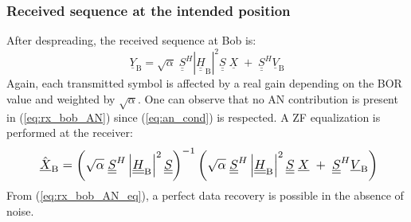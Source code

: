 \documentclass[conference]{IEEEtran}
\begin{document}
\subsubsection{Received sequence at the intended position}
After despreading, the received sequence at Bob is: 
\begin{equation}
    \underline{Y}_{\text{B}} = \sqrt{\alpha} \; \underline{\underline{S}}^H \left|\underline{\underline{H}}_{\text{B}} \right|^2 \underline{\underline{S}}\; \underline{X} \;  +  \;  \underline{\underline{S}}^H \underline{V}_\text{B} 
    \label{eq:rx_bob_AN}
\end{equation}
Again, each transmitted symbol is affected by a real gain depending on the BOR value and weighted by $\sqrt{\alpha}$. One can observe that no AN contribution is present in (\ref{eq:rx_bob_AN}) since (\ref{eq:an_cond}) is respected. A ZF equalization is performed at the receiver:
\begin{equation}
 \resizebox{0.89\hsize}{!}{
    $\hat{\underline{X}}_{\text{B}} = \left( \sqrt{\alpha} \; \underline{\underline{S}}^H \left|\underline{\underline{H}}_{\text{B}} \right|^2 \underline{\underline{S}} \right)^{-1}  \left(\sqrt{\alpha} \; \underline{\underline{S}}^H \left|\underline{\underline{H}}_{\text{B}} \right|^2 \underline{\underline{S}}\; \underline{X} \;  +  \;  \underline{\underline{S}}^H \underline{V}_\text{B}\right)$} 
    \label{eq:rx_bob_AN_eq}
\end{equation}
From (\ref{eq:rx_bob_AN_eq}), a perfect data recovery is possible in the absence of noise.
\end{document}
